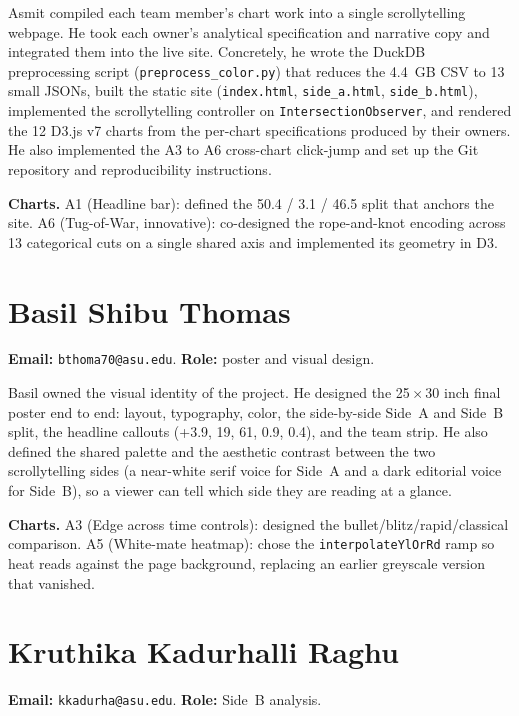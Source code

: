 \documentclass[sigconf,nonacm,natbib=false]{acmart}
\begin{document}
Asmit compiled each team member's chart work into a single
scrollytelling webpage. He took each owner's analytical
specification and narrative copy and integrated them into the live
site. Concretely, he wrote the DuckDB preprocessing script
(\texttt{preprocess\_color.py}) that reduces the 4.4~GB CSV to 13
small JSONs, built the static site
(\texttt{index.html}, \texttt{side\_a.html}, \texttt{side\_b.html}),
implemented the scrollytelling controller on
\texttt{IntersectionObserver}, and rendered the 12 D3.js v7 charts
from the per-chart specifications produced by their owners. He also
implemented the A3 to A6 cross-chart click-jump and set up the Git
repository and reproducibility instructions.

\textbf{Charts.}
A1 (Headline bar): defined the 50.4 / 3.1 / 46.5 split that anchors
the site.
A6 (Tug-of-War, innovative): co-designed the rope-and-knot encoding
across 13 categorical cuts on a single shared axis and implemented
its geometry in D3.

\section{Basil Shibu Thomas}
\textbf{Email:} \texttt{bthoma70@asu.edu}.
\textbf{Role:} poster and visual design.

Basil owned the visual identity of the project. He designed the
25\,$\times$\,30 inch final poster end to end: layout, typography,
color, the side-by-side Side~A and Side~B split, the headline
callouts (+3.9, 19, 61, 0.9, 0.4), and the team strip. He also
defined the shared palette and the aesthetic contrast between the
two scrollytelling sides (a near-white serif voice for Side~A and a
dark editorial voice for Side~B), so a viewer can tell which side
they are reading at a glance.

\textbf{Charts.}
A3 (Edge across time controls): designed the
bullet/blitz/rapid/classical comparison.
A5 (White-mate heatmap): chose the \texttt{interpolateYlOrRd} ramp
so heat reads against the page background, replacing an earlier
greyscale version that vanished.

\section{Kruthika Kadurhalli Raghu}
\textbf{Email:} \texttt{kkadurha@asu.edu}.
\textbf{Role:} Side~B analysis.
\end{document}
